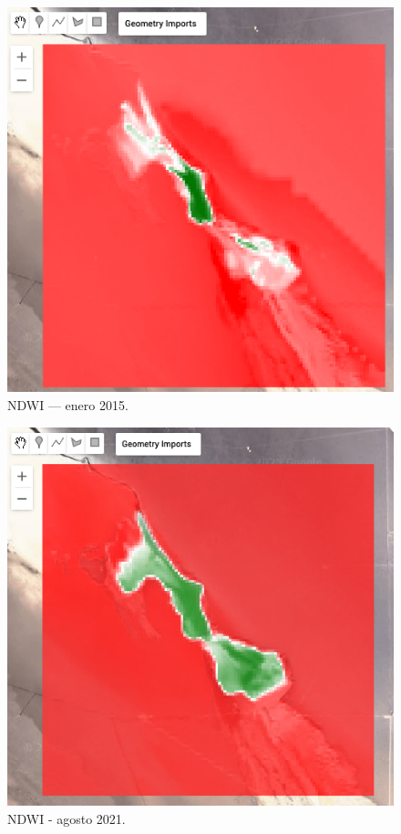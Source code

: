 \begin{figure}[ht]
        \centering
        \includegraphics[scale=.37]
        {Figures/fig9_seco.png}
        \caption{NDWI — enero 2015.}
        \label{fig:ndwi_seco}
\end{figure}


\begin{figure}[ht]
        \centering
        \includegraphics[scale=.37]
        {Figures/fig10_hum.png}
        \caption{NDWI - agosto 2021.}
        \label{fig:ndwi_hum}
\end{figure}

